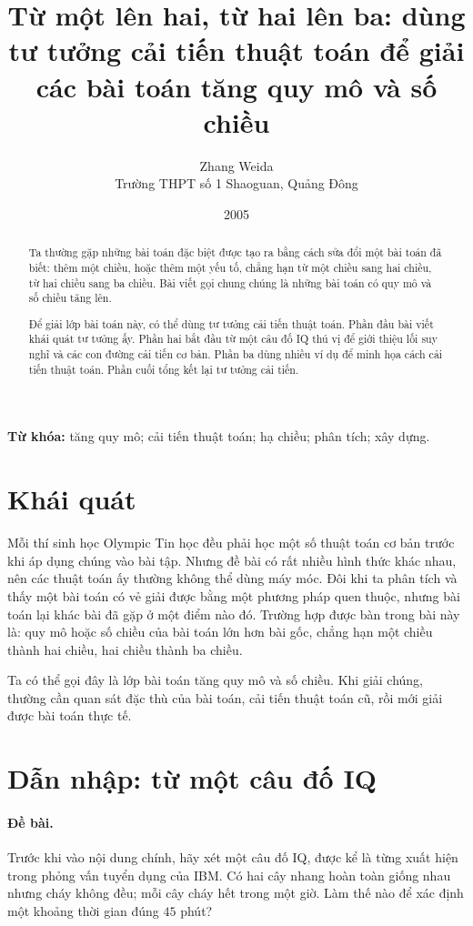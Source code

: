 \documentclass[11pt]{article}
\title{Từ một lên hai, từ hai lên ba: dùng tư tưởng cải tiến thuật toán để giải các bài toán tăng quy mô và số chiều}
\author{Zhang Weida\\Trường THPT số 1 Shaoguan, Quảng Đông}
\date{2005}
\begin{document}
\maketitle


\renewcommand{\abstractname}{Tóm tắt}
\begin{abstract}
Ta thường gặp những bài toán đặc biệt được tạo ra bằng cách sửa đổi một bài
toán đã biết: thêm một chiều, hoặc thêm một yếu tố, chẳng hạn từ một chiều
sang hai chiều, từ hai chiều sang ba chiều. Bài viết gọi chung chúng là những
bài toán có quy mô và số chiều tăng lên.

Để giải lớp bài toán này, có thể dùng tư tưởng cải tiến thuật toán. Phần đầu
bài viết khái quát tư tưởng ấy. Phần hai bắt đầu từ một câu đố IQ thú vị để
giới thiệu lối suy nghĩ và các con đường cải tiến cơ bản. Phần ba dùng nhiều
ví dụ để minh họa cách cải tiến thuật toán. Phần cuối tổng kết lại tư tưởng
cải tiến.
\end{abstract}

\noindent\textbf{Từ khóa:} tăng quy mô; cải tiến thuật toán; hạ chiều; phân
tích; xây dựng.

\section{Khái quát}

Mỗi thí sinh học Olympic Tin học đều phải học một số thuật toán cơ bản trước
khi áp dụng chúng vào bài tập. Nhưng đề bài có rất nhiều hình thức khác nhau,
nên các thuật toán ấy thường không thể dùng máy móc. Đôi khi ta phân tích và
thấy một bài toán có vẻ giải được bằng một phương pháp quen thuộc, nhưng bài
toán lại khác bài đã gặp ở một điểm nào đó. Trường hợp được bàn trong bài này
là: quy mô hoặc số chiều của bài toán lớn hơn bài gốc, chẳng hạn một chiều
thành hai chiều, hai chiều thành ba chiều.

Ta có thể gọi đây là lớp bài toán tăng quy mô và số chiều. Khi giải chúng,
thường cần quan sát đặc thù của bài toán, cải tiến thuật toán cũ, rồi mới giải
được bài toán thực tế.

\section{Dẫn nhập: từ một câu đố IQ}

\paragraph{Đề bài.}
Trước khi vào nội dung chính, hãy xét một câu đố IQ, được kể là từng xuất
hiện trong phỏng vấn tuyển dụng của IBM. Có hai cây nhang hoàn toàn giống
nhau nhưng cháy không đều; mỗi cây cháy hết trong một giờ. Làm thế nào để xác
định một khoảng thời gian đúng $45$ phút?
\end{document}
